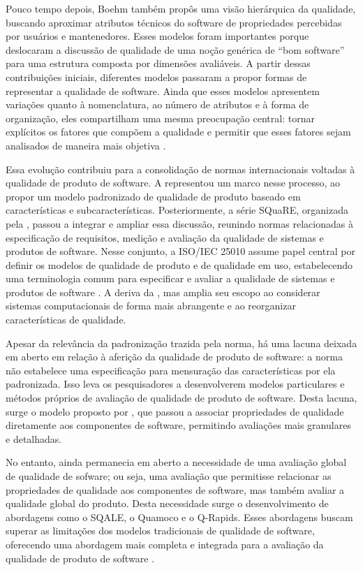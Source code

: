 Pouco tempo depois, Boehm também propôs uma visão hierárquica da qualidade, buscando aproximar atributos técnicos do software de propriedades percebidas por usuários e mantenedores. Esses modelos foram importantes porque deslocaram a discussão de qualidade de uma noção genérica de ``bom software'' para uma estrutura composta por dimensões avaliáveis. A partir dessas contribuições iniciais, diferentes modelos passaram a propor formas de representar a qualidade de software. Ainda que esses modelos apresentem variações quanto à nomenclatura, ao número de atributos e à forma de organização, eles compartilham uma mesma preocupação central: tornar explícitos os fatores que compõem a qualidade e permitir que esses fatores sejam analisados de maneira mais objetiva \cite{boehm1978}.

Essa evolução contribuiu para a consolidação de normas internacionais voltadas à qualidade de produto de software. A  representou um marco nesse processo, ao propor um modelo padronizado de qualidade de produto baseado em características e subcaracterísticas. Posteriormente, a série SQuaRE, organizada pela , passou a integrar e ampliar essa discussão, reunindo normas relacionadas à especificação de requisitos, medição e avaliação da qualidade de sistemas e produtos de software. Nesse conjunto, a ISO/IEC 25010 assume papel central por definir os modelos de qualidade de produto e de qualidade em uso, estabelecendo uma terminologia comum para especificar e avaliar a qualidade de sistemas e produtos de software \cite{isoiec25010}. A  deriva da , mas amplia seu escopo ao considerar sistemas computacionais de forma mais abrangente e ao reorganizar características de qualidade.

Apesar da relevância da padronização trazida pela norma, há uma lacuna deixada em aberto em relação à aferição da qualidade de produto de software: a norma não estabelece uma especificação para mensuração das características por ela padronizada. Isso leva os pesquisadores a desenvolverem modelos particulares e métodos próprios de avaliação de qualidade de produto de software. Desta lacuna, surge o modelo proposto por , que passou a associar propriedades de qualidade diretamente aos componentes de software, permitindo avaliações mais granulares e detalhadas.

No entanto, ainda permanecia em aberto a necessidade de uma avaliação global de qualidade de sofware; ou seja, uma avaliação que permitisse relacionar as propriedades de qualidade aos componentes de software, mas também avaliar a qualidade global do produto. Desta necessidade surge o desenvolvimento de abordagens como o SQALE, o Quamoco e o Q-Rapids. Esses abordagens buscam superar as limitações dos modelos tradicionais de qualidade de software, oferecendo uma abordagem mais completa e integrada para a avaliação da qualidade de produto de software \cite{wagner2012quamoco, letouzey2012sqale, MartinezEtAll}.

